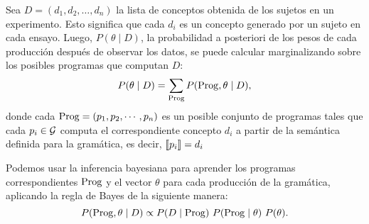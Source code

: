 Sea $D = (d_1, d_2, \dots, d_n)$ la lista de conceptos obtenida de los sujetos en un experimento. Esto significa que cada $d_i$ es un concepto generado por un sujeto en cada ensayo. Luego, $P(\theta \mid D)$, la probabilidad a posteriori de los pesos de cada producción después de observar los datos, se puede calcular marginalizando sobre los posibles programas que computan $D$:
%
\begin{equation*}
\label{eqA}
P(\theta \mid D) = \sum_{\Prog } P(\Prog,\theta \mid D),
\end{equation*} donde cada $\Prog  = (p_1, p_2, \cdots, p_n)$ es un posible conjunto de programas tales que cada $p_i \in \gram$ computa el correspondiente concepto $d_i$ a partir de la semántica definida para la gramática, es decir, $\sem{p_i} = d_i$

Podemos usar la inferencia bayesiana para aprender los programas correspondientes $\Prog$ y el vector $\theta$ para cada producción de la gramática, aplicando la regla de Bayes de la siguiente manera:
%
\begin{equation}
\label{eq:mainB}
P(\Prog,\theta \mid D) \propto P(D \mid \Prog)\ P(\Prog \mid \theta)\ P(\theta).
\end{equation}
%


